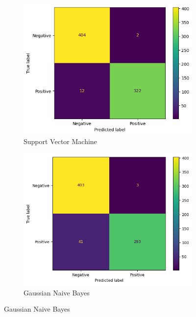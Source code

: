 \begin{figure}[!ht]
    \centering
    \begin{subfigure}{0.45\textwidth}
        \centering
        \includegraphics[width=\textwidth]{img/svm/matrice_confusione_corr.png}
        \caption{Support Vector Machine}
        \label{fig:matrice_di_confusione_per_SVM_corr}
    \end{subfigure}
    \hfill
    \begin{subfigure}{.45\textwidth}
        \centering
        \includegraphics[width=\textwidth]{img/gnb/confusion_matrix_corr.png}
        \caption{Gaussian Naive Bayes}
        \label{fig:matrice_di_confusione_per_GNB_corr}

\end{subfigure}
\end{figure}
